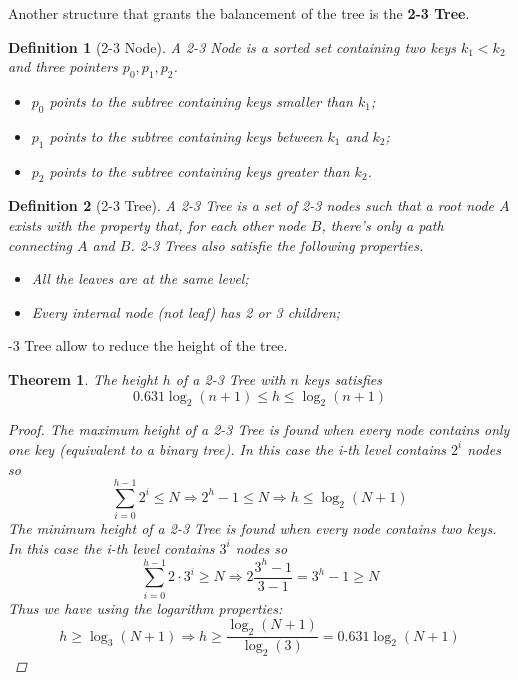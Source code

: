 \documentclass{report}
\newtheorem{defin}{Definition}[chapter]
\newtheorem{teo}{Theorem}[chapter]
\begin{document}
\noindent Another structure that grants the balancement of the tree is the \textbf{2-3 Tree}.
\begin{defin}[2-3 Node]
    A 2-3 Node is a sorted set containing two keys \(k_1<k_2\) and three pointers \(p_0,p_1,p_2\).
    \begin{itemize}
        \item \(p_0\) points to the subtree containing keys smaller than \(k_1\);
        \item \(p_1\) points to the subtree containing keys between \(k_1\) and \(k_2\);
        \item \(p_2\) points to the subtree containing keys greater than \(k_2\).
    \end{itemize}
\end{defin}
\begin{defin}[2-3 Tree]
    A 2-3 Tree is a set of 2-3 nodes such that a root node \(A\) exists with the property that, for each other node \(B\), there's only a path connecting \(A\) and \(B\). 2-3 Trees also satisfie the following properties.
    \begin{itemize}
        \item All the leaves are at the same level;
        \item Every internal node (not leaf) has 2 or 3 children;
    \end{itemize}
\end{defin}
-3 Tree allow to reduce the height of the tree.
\begin{teo}
    The height \(h\) of a 2-3 Tree with \(n\) keys satisfies
    \begin{equation}
        0.631 \log_2 (n+1) \leq h \leq \log_2(n+1)
    \end{equation}
    \begin{proof}
        The maximum height of a 2-3 Tree is found when every node contains only one key (equivalent to a binary tree). In this case the i-th level contains \(2^i\) nodes so
        \begin{equation}
            \sum_{i=0}^{h-1} 2^i \leq N \Rightarrow 2^h - 1 \leq N \Rightarrow h \leq \log_2(N+1)
        \end{equation}
        \noindent The minimum height of a 2-3 Tree is found when every node contains two keys. In this case the i-th level contains \(3^i\) nodes so
        \begin{equation}
            \sum_{i=0}^{h-1} 2 \cdot 3^i \geq N \Rightarrow 2 \frac{3^h - 1}{3-1} = 3^h - 1 \geq N
        \end{equation}
        \noindent Thus we have using the logarithm properties:
        \begin{equation}
            h \geq \log_3(N+1) \Rightarrow h \geq \frac{\log_2(N+1)}{\log_2(3)} = 0.631 \log_2(N+1)
        \end{equation}
    \end{proof}
\end{teo}
\end{document}
